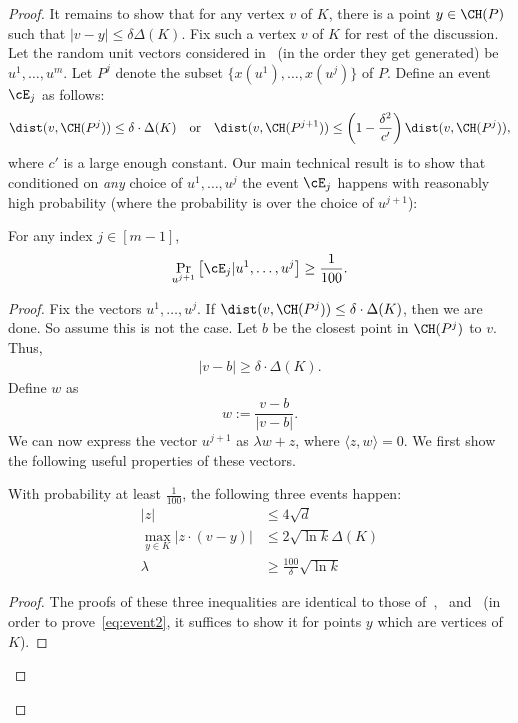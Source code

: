 \begin{proof}
It remains to show that for any vertex $v$ of $K$, there is a point $y \in \CH(P)$ such that $|v-y| \leq \delta \Delta(K)$. Fix such a vertex $v$ of $K$ for rest of the discussion. Let the random unit vectors considered  in~ (in the order they get generated) be $u^1, \ldots, u^m$. Let $P^j$ denote the subset $\{x(u^1), \ldots, x(u^j)\}$ of $P$. Define an event $\cE_j$ as follows:
$$ \dist(v, \CH(P^j)) \leq \delta \cdot \Delta(K) \quad \mbox{or} \quad \dist(v, \CH(P^{j+1})) \leq \left(1 - \frac{\delta^2}{c'} \right) \dist(v, \CH(P^j)),$$
where $c'$ is a large enough constant. Our main technical result is to show that conditioned on {\em any} choice of $u^1, \ldots, u^j$ the event $\cE_j$ happens with reasonably high probability (where the probability is over the choice of $u^{j+1}$)$:$
\begin{lemma}
    \label{lem:tech1}
    For any index $j \in [m-1]$, 
    $$ \Pr_{u^{j+1}} \left[\cE_j|u^1, \ldots, u^j \right] \geq \frac{1}{100}. $$
\end{lemma}
\begin{proof}
    Fix the vectors $u^1, \ldots, u^j$. If $\dist(v, \CH(P^j)) \leq \delta \cdot \Delta(K)$, then we are done. So assume this is not the case. Let $b$ be the closest point in $\CH(P^j)$ to $v$. Thus, 
    \begin{align}
        \label{eq:b}
        |v-b| \geq \delta \cdot \Delta(K).
    \end{align}Define $w$ as $$ w:= \frac{v-b}{|v-b|}.$$
 We can now express the vector $u^{j+1}$ as $\lambda w + z$, where $\langle z, w \rangle = 0$. We first show the following useful properties of these vectors. 

 \begin{claim}
     \label{cl:tech2}
     With probability at least $\frac{1}{100}$, the following three events happen:
     \begin{align}
         |z| & \leq 4 \sqrt{d} \label{eq:event1} \\
         \max_{y \in K} |z \cdot (v-y)| & \leq 2 \sqrt{\ln k} \Delta(K) \label{eq:event2} \\
         \lambda & \geq \frac{100}{\delta} \sqrt{\ln k} \label{eq:event3}
     \end{align}
 \end{claim}
    \begin{proof}
        The proofs of these three inequalities are identical to those of~,~ and~ (in order to prove~\eqref{eq:event2}, it suffices to show it for points $y$ which are vertices of $K$). 
    \end{proof}


\end{proof}
\end{proof}
